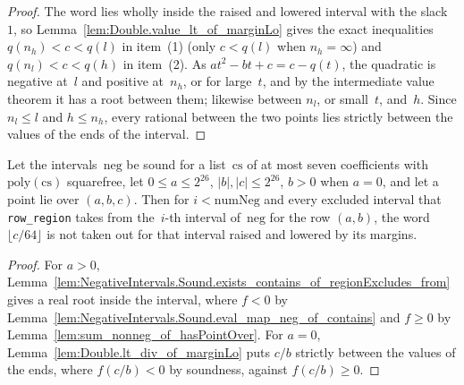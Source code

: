 \begin{proof}
  \leanok
  The word lies wholly inside the raised and lowered interval with the slack~$1$, so
  Lemma~\ref{lem:Double.value_lt_of_marginLo} gives the exact inequalities $q(n_h) < c < q(l)$ in
  item~(1) (only $c < q(l)$ when $n_h = \infty$) and $q(n_l) < c < q(h)$ in item~(2). As
  $a t^2 - b t + c = c - q(t)$, the quadratic is negative at~$l$ and positive at~$n_h$, or for
  large~$t$, and by the intermediate value theorem it has a root between them; likewise between
  $n_l$, or small~$t$, and~$h$. Since $n_l \le l$ and $h \le n_h$, every rational between the two
  points lies strictly between the values of the ends of the interval.
\end{proof}

\begin{lemma}\label{lem:NegativeIntervals.Sound.not_regionExcludes_of_hasPointOver}
  \leanok
  Let the intervals~$\mathrm{neg}$ be sound for a list~$\mathrm{cs}$ of at most seven coefficients
  with $\mathrm{poly}(\mathrm{cs})$ squarefree, let $0 \le a \le 2^{26}$, $|b|, |c| \le 2^{26}$,
  $b > 0$ when $a = 0$, and let a point lie over $(a, b, c)$. Then for $i < \mathrm{numNeg}$ and
  every excluded interval that \texttt{row\_region} takes from the~$i$-th interval of~$\mathrm{neg}$
  for the row $(a, b)$, the word $\lfloor c/64 \rfloor$ is not taken out for that interval raised
  and lowered by its margins.
\end{lemma}

\begin{proof}
  \leanok
  For $a > 0$, Lemma~\ref{lem:NegativeIntervals.Sound.exists_contains_of_regionExcludes_from}
  gives a real root inside the interval, where $f < 0$ by
  Lemma~\ref{lem:NegativeIntervals.Sound.eval_map_neg_of_contains} and $f \ge 0$ by
  Lemma~\ref{lem:sum_nonneg_of_hasPointOver}. For $a = 0$, Lemma~\ref{lem:Double.lt_div_of_marginLo}
  puts $c/b$ strictly between the values of the ends, where $f(c/b) < 0$ by soundness, against
  $f(c/b) \ge 0$.
\end{proof}


